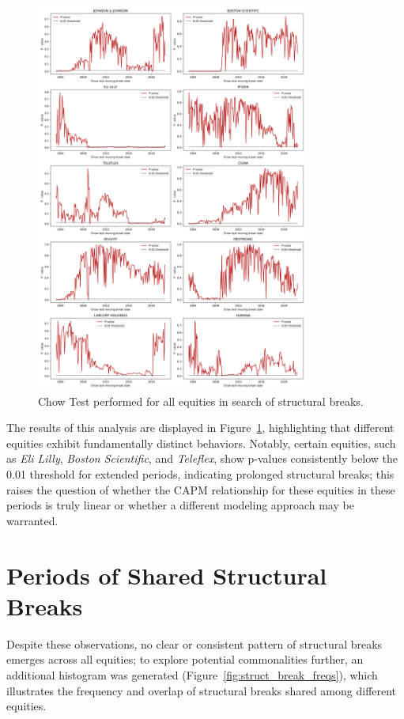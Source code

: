 \begin{figure}[h!]
    \centering
    \includegraphics[width=0.8\textwidth]{images/chowmoving.png}
    \caption{Chow Test performed for all equities in search of structural breaks.}\label{fig:chowmoving}
\end{figure}

The results of this analysis are displayed in Figure~\ref{fig:chowmoving}, highlighting that different equities exhibit 
fundamentally distinct behaviors. 
Notably, certain equities, such as \textit{Eli Lilly}, \textit{Boston Scientific}, and \textit{Teleflex}, show p-values
consistently below the 0.01 threshold for extended periods, indicating prolonged structural breaks; this raises the question
of whether the CAPM relationship for these equities in these periods is truly linear or whether a different modeling approach
may be warranted.

\section{Periods of Shared Structural Breaks}

Despite these observations, no clear or consistent pattern of structural breaks emerges across all equities; to explore 
potential commonalities further, an additional histogram was generated (Figure~\ref{fig:struct_break_freqs}), which illustrates
the frequency and overlap of structural breaks shared among different equities.


